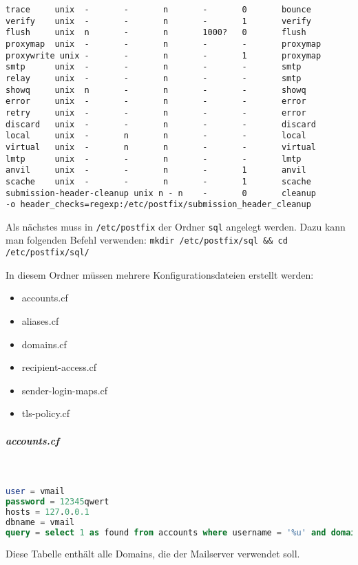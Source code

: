 \begin{lstlisting}[caption=master.cf - Postfix]
trace     unix  -       -       n       -       0       bounce
verify    unix  -       -       n       -       1       verify
flush     unix  n       -       n       1000?   0       flush
proxymap  unix  -       -       n       -       -       proxymap
proxywrite unix -       -       n       -       1       proxymap
smtp      unix  -       -       n       -       -       smtp
relay     unix  -       -       n       -       -       smtp
showq     unix  n       -       n       -       -       showq
error     unix  -       -       n       -       -       error
retry     unix  -       -       n       -       -       error
discard   unix  -       -       n       -       -       discard
local     unix  -       n       n       -       -       local
virtual   unix  -       n       n       -       -       virtual
lmtp      unix  -       -       n       -       -       lmtp
anvil     unix  -       -       n       -       1       anvil
scache    unix  -       -       n       -       1       scache
submission-header-cleanup unix n - n    -       0       cleanup
-o header_checks=regexp:/etc/postfix/submission_header_cleanup
\end{lstlisting}

Als nächstes muss in \verb|/etc/postfix| der Ordner \verb|sql| angelegt werden. Dazu kann man folgenden Befehl verwenden:\newline
\verb|mkdir /etc/postfix/sql && cd /etc/postfix/sql/|\newline

In diesem Ordner müssen mehrere Konfigurationsdateien erstellt werden:
\begin{itemize}
	\item accounts.cf
	\item aliases.cf
	\item domains.cf
	\item recipient-access.cf
	\item sender-login-maps.cf
	\item tls-policy.cf
\end{itemize}

\subparagraph{accounts.cf}\mbox{}\\
\begin{lstlisting}[language=SQL, caption=postfix - accounts.cf]
user = vmail
password = 12345qwert
hosts = 127.0.0.1
dbname = vmail
query = select 1 as found from accounts where username = '%u' and domain = '%d' and enabled = true LIMIT 1;
\end{lstlisting}
Diese Tabelle enthält alle Domains, die der Mailserver verwendet soll.

